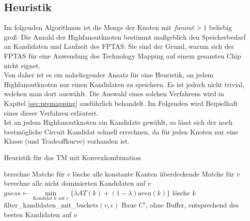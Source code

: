 \documentclass[11pt, a4paper, german]{article}
\newcommand{\TM}{Technology Mapping }
\begin{document}
\subsection{Heuristik}
\label{subsec:heuristik}
Im folgenden Algorithmus ist die Menge der Knoten mit $fanout > 1$ beliebig groß.
Die Anzahl der Highfanoutknoten bestimmt maßgeblich den Speicherbedarf an Kandidaten und Laufzeit des FPTAS. Sie sind der Grund, warum sich der FPTAS für eine Anwendung des \TM auf einem gesamten Chip nicht eignet. \\
Von daher ist es ein naheliegender Ansatz für eine Heuristik, an jedem Highfanoutknoten nur einen Kandidaten zu speichern. Es ist jedoch nicht trivial, welchen man dort auswählt. Die Auswahl eines solchen Verfahrens wird in Kapitel \ref{sec:premapping} ausführlich behandelt. Im Folgenden wird Beipielhaft eines dieser Verfahren erläutert. \\
Ist an jedem Highfanoutknoten ein Kandidate gewählt, so lässt sich der noch bestmögliche Circuit Kandidat schnell errechnen, da für jeden Knoten nur eine Klasse (und Tradeoffkurve) vorhanden ist.\\
\begin{algorithm}[H]
 \LinesNumbered
 \DontPrintSemicolon
 \caption{Heuristik f\"ur das TM mit Konvexkombination}
 {
  berechne Matche für $v$\;
  lösche alle konstante Kanten überdeckende Matche für $v$\;
  berechne alle nicht dominierten Kandidaten auf $v$\;
  {
    $guess \gets \min\limits_{\text{Kandidat }k\text{ auf }v}\{ \lambda AT(k) + (1-\lambda) area(k)  \}$\;
    {
      {
	l\"osche $k$\;
      }
    }
  }
  filter\_kandidaten\_mit\_buckets$(v,\epsilon)$\;
 }
 Baue $C'$, ohne Buffer, entsprechend des besten Kandidaten auf $o$ \; 
\end{algorithm}\ \\
\end{document}
